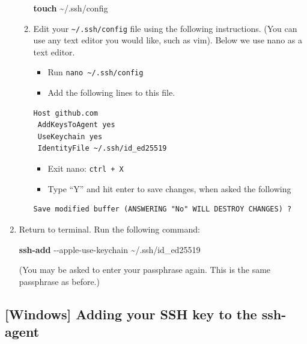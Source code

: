 \documentclass[
]{book}
\newenvironment{Shaded}{\begin{snugshade}}{\end{snugshade}}
\newcommand{\AttributeTok}[1]{\textcolor[rgb]{0.13,0.29,0.53}{#1}}
\newcommand{\FunctionTok}[1]{\textcolor[rgb]{0.13,0.29,0.53}{\textbf{#1}}}
\newcommand{\NormalTok}[1]{#1}
\providecommand{\tightlist}{%
  \setlength{\itemsep}{0pt}\setlength{\parskip}{0pt}}
\theoremstyle{definition}
\theoremstyle{definition}
\theoremstyle{definition}
\theoremstyle{definition}
\theoremstyle{remark}
\begin{document}
\begin{enumerate}
\begin{enumerate}
\begin{Shaded}
\begin{Highlighting}[]
\FunctionTok{touch}\NormalTok{ \textasciitilde{}/.ssh/config}
\end{Highlighting}
\end{Shaded}
  \item
    Edit your \texttt{\textasciitilde{}/.ssh/config} file using the following instructions. (You can use any text editor you would like, such as vim). Below we use nano as a text editor.

    \begin{itemize}
    \tightlist
    \item
      Run \texttt{nano\ \textasciitilde{}/.ssh/config}
    \item
      Add the following lines to this file.
    \end{itemize}

\begin{verbatim}
Host github.com
 AddKeysToAgent yes
 UseKeychain yes
 IdentityFile ~/.ssh/id_ed25519
\end{verbatim}

    \begin{itemize}
    \tightlist
    \item
      Exit nano: \texttt{ctrl\ +\ X}
    \item
      Type ``Y'' and hit enter to save changes, when asked the following
    \end{itemize}

\begin{verbatim}
Save modified buffer (ANSWERING "No" WILL DESTROY CHANGES) ?
\end{verbatim}
  \end{enumerate}
\item
  Return to terminal. Run the following command:

\begin{Shaded}
\begin{Highlighting}[]
\FunctionTok{ssh{-}add} \AttributeTok{{-}{-}apple{-}use{-}keychain}\NormalTok{ \textasciitilde{}/.ssh/id\_ed25519}
\end{Highlighting}
\end{Shaded}

  (You may be asked to enter your passphrase again. This is the same passphrase as before.)
\end{enumerate}

\subsection{{[}Windows{]} Adding your SSH key to the ssh-agent}\label{windows-add-ssh-key}
\end{document}

